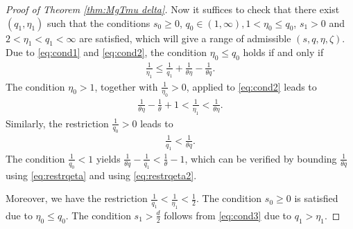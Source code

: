 \documentclass[reqno]{amsart}
\theoremstyle{plain}
\theoremstyle{remark}
\theoremstyle{plain}
\numberwithin{equation}{section}
\newcommand{\1}{\one}
\begin{document}
\begin{proof}[Proof of Theorem \ref{thm:MgTmu delta}]
Now it suffices to check that there exist $(q_1, \eta_1)$ such that the conditions 
$s_0\geq 0$, $q_0\in (1, \infty), 1<\eta_0\leq q_0$, $s_1>0$ and $2<\eta_1<q_1<\infty$ are satisfied, which will give a range of admissible $(s,q,\eta,\zeta)$.
Due to \eqref{eq:cond1} and \eqref{eq:cond2}, the condition $\eta_0\leq q_0$ holds if and only if  
\begin{align}\label{eq:restrqeta}
  \frac{1}{\eta_1} \leq   \frac{1}{q_1}   + \frac{1}{\theta \eta} - \frac{1}{\theta q}.
\end{align} 
The condition $\eta_0>1$, together with $\tfrac{1}{\eta_0}>0$, applied to \eqref{eq:cond2} leads to  
\begin{align}\label{eq:restrqeta2}
\frac{1}{\theta \eta} - \frac{1}{\theta}+1<\frac{1}{\eta_1}<\frac{1}{\theta \eta}.
\end{align} 
Similarly, the restriction $\frac{1}{q_0}>0$ leads to 
\begin{align}\label{eq:restrqeta3}
\frac{1}{q_1}<\frac{1}{\theta q}.
\end{align} 
The condition $\tfrac{1}{q_0}<1$ yields $\tfrac{1}{\theta q}-\tfrac{1}{q_1}<\tfrac{1}{\theta}-1$, which can be verified by bounding $\tfrac{1}{\theta q}$ using \eqref{eq:restrqeta} and using \eqref{eq:restrqeta2}.

Moreover, we have the restriction $\frac{1}{q_1}<\frac{1}{\eta_1}<\frac12$. The condition $s_0\geq 0$ is satisfied due to $\eta_0\leq q_0$. The condition $s_1>\tfrac{d}{2}$  follows from \eqref{eq:cond3} due to $q_1>\eta_1$. 
 

\end{proof}
\end{document}
